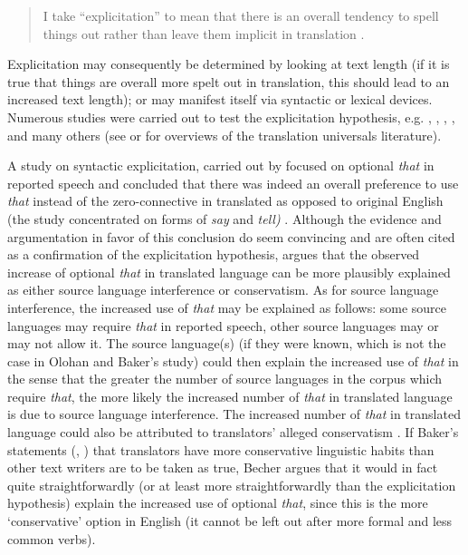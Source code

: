 \begin{quote}
I take “explicitation” to mean that there is an overall tendency to spell things out rather than leave them implicit in translation \citep[180]{baker_corpus-based_1996}.
\end{quote}

Explicitation may consequently be determined by looking at text length (if it is true that things are overall more spelt out in translation, this should lead to an increased text length); or may manifest itself via syntactic or lexical devices. Numerous studies were carried out to test the explicitation hypothesis, e.g. \citet{overas_search_1998}, \citet{olohan_reporting_2000}, \citet{olohan_how_2003}, \citet{mutesayire_apposition_2004}, \citet{mauranen_explicitation_2004} and many others (see \citealt{Kruger2012} or \citealt{zanettin_corpus_2013} for overviews of the translation universals literature).

A study on syntactic explicitation, carried out by \citet{olohan_reporting_2000} focused on optional \textit{that} in reported speech and concluded that there was indeed an overall preference to use \textit{that} instead of the zero-connective in translated as opposed to original English (the study concentrated on forms of \textit{say} and \textit{tell)} \citep[157]{olohan_reporting_2000}. Although the evidence and argumentation in favor of this conclusion do seem convincing and are often cited as a confirmation of the explicitation hypothesis, \citet[10--11]{becher_abandoning_2010} argues that the observed increase of optional \textit{that} in translated language can be more plausibly explained as either source language interference or conservatism. As for source language interference, the increased use of \textit{that} may be explained as follows: some source languages may require \textit{that} in reported speech, other source languages may or may not allow it. The source language(s) (if they were known, which is not the case in Olohan and Baker’s study) could then explain the increased use of \textit{that} in the sense that the greater the number of source languages in the corpus which require \textit{that}, the more likely the increased number of \textit{that} in translated language is due to source language interference. The increased number of \textit{that} in translated language could also be attributed to translators’ alleged conservatism \citep{becher_abandoning_2010}. If Baker’s statements (\citealt[244]{baker_corpus_1993}, \citealt[183]{baker_corpus-based_1996}) that translators have more conservative linguistic habits than other text writers are to be taken as true, Becher argues that it would in fact quite straightforwardly (or at least more straightforwardly than the explicitation hypothesis) explain the increased use of optional \textit{that}, since this is the more ‘conservative’ option in English (it cannot be left out after more formal and less common verbs).


